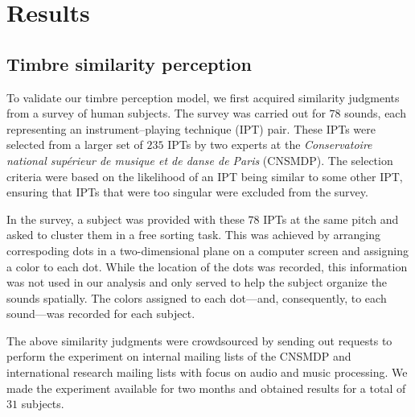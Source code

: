 \documentclass[10pt,letterpaper]{article}
\begin{document}
\section*{Results}


\subsection*{Timbre similarity perception}
\label{sec:survey}

To validate our timbre perception model, we first acquired similarity judgments from a survey of human subjects.
The survey was carried out for $78$ sounds, each representing an instrument--playing technique (IPT) pair.
These IPTs were selected from a larger set of $235$ IPTs by two experts at the \emph{Conservatoire national sup\'erieur de musique et de danse de Paris} (CNSMDP).
The selection criteria were based on the likelihood of an IPT being similar to some other IPT, ensuring that IPTs that were too singular were excluded from the survey.

In the survey, a subject was provided with these $78$ IPTs at the same pitch and asked to cluster them in a free sorting task.
This was achieved by arranging correspoding dots in a two-dimensional plane on a computer screen and assigning a color to each dot.
While the location of the dots was recorded, this information was not used in our analysis and only served to help the subject organize the sounds spatially.
The colors assigned to each dot---and, consequently, to each sound---was recorded for each subject.

The above similarity judgments were crowdsourced by sending out requests to perform the experiment on internal mailing lists of the CNSMDP and international research mailing lists with focus on audio and music processing.
We made the experiment available for two months and obtained results for a total of $31$ subjects.
\end{document}
